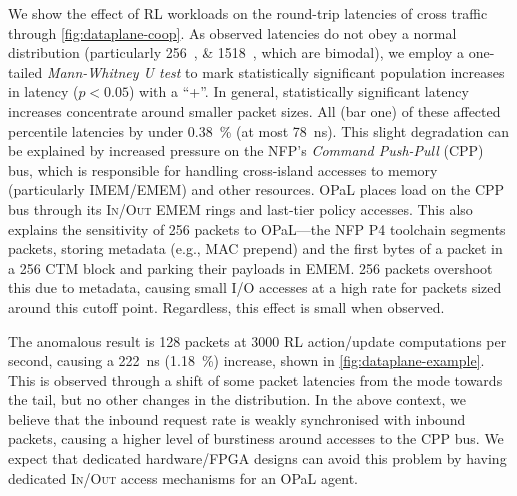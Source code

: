 \documentclass[
sigconf,natbib=false
]{acmart}
\newcommand{\approachshort}{OPaL}
\newcommand{\inring}{\textsc{In}}
\newcommand{\outring}{\textsc{Out}}
\begin{document}
We show the effect of RL workloads on the round-trip latencies of cross traffic through \cref{fig:dataplane-coop}.
As observed latencies do not obey a normal distribution (particularly \SIlist{256;1518}{\byte}, which are bimodal), we employ a one-tailed \emph{Mann-Whitney U test} to mark statistically significant population increases in latency ($p < 0.05$) with a ``+''.
In general, statistically significant latency increases concentrate around smaller packet sizes.
All (bar one) of these affected  percentile latencies by under \SI{0.38}{\percent} (at most \SI{78}{\nano\second}).
This slight degradation can be explained by increased pressure on the NFP's \emph{Command Push-Pull} (CPP) bus, which is responsible for handling cross-island accesses to memory (particularly IMEM/EMEM) and other resources.
\approachshort{} places load on the CPP bus through its \inring{}/\outring{} EMEM rings and last-tier policy accesses.
This also explains the sensitivity of \SI{256}{\byte} packets to \approachshort{}---the NFP P4 toolchain segments packets, storing metadata (e.g., MAC prepend) and the first bytes of a packet in a \SI{256}{\byte} CTM block and parking their payloads in EMEM.
\SI{256}{\byte} packets overshoot this due to metadata, causing small I/O accesses at a high rate for packets sized around this cutoff point.
Regardless, this effect is small when observed.

The anomalous result is \SI{128}{\byte} packets at \num{3000} RL action/update computations per second, causing a \SI{222}{\nano\second} (\SI{1.18}{\percent}) increase, shown in \cref{fig:dataplane-example}.
This is observed through a shift of some packet latencies from the mode towards the tail, but no other changes in the distribution.
In the above context, we believe that the inbound request rate is weakly synchronised with inbound packets, causing a higher level of burstiness around accesses to the CPP bus.
We expect that dedicated hardware/FPGA designs can avoid this problem by having dedicated \inring{}/\outring{} access mechanisms for an \approachshort{} agent.
\end{document}
